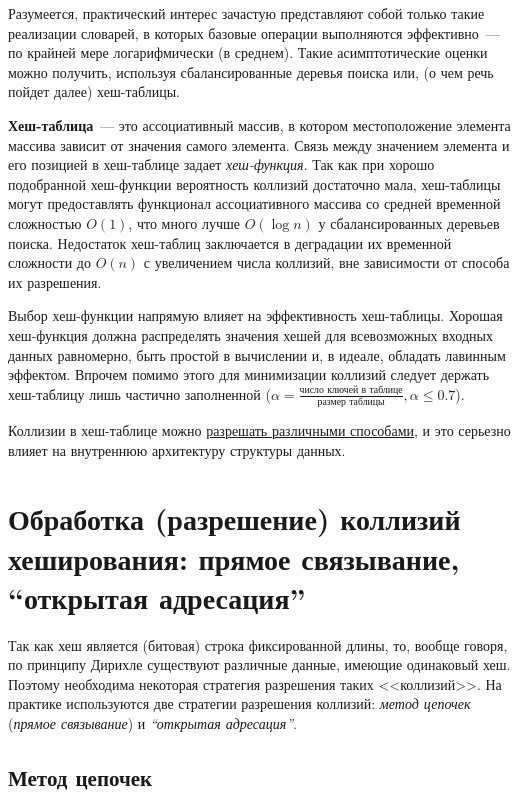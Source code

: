 Разумеется, практический интерес зачастую представляют собой только такие реализации словарей, в которых базовые операции выполняются эффективно~---
по крайней мере логарифмически (в среднем). Такие асимптотические оценки можно получить, используя сбалансированные деревья поиска или,
(о чем речь пойдет далее) хеш-таблицы.

\textbf{Хеш-таблица}~--- это ассоциативный массив, в котором местоположение элемента массива зависит от значения самого элемента.
Связь между значением элемента и его позицией в хеш-таблице задает \textit{хеш-функция}.
Так как при хорошо подобранной хеш-функции вероятность коллизий достаточно мала, хеш-таблицы могут предоставлять функционал ассоциативного массива
со средней временной сложностью $O(1)$, что много лучше $O(\log{n})$ у сбалансированных деревьев поиска. Недостаток хеш-таблиц заключается в
деградации их временной сложности до $O(n)$ с увеличением числа коллизий, вне зависимости от способа их разрешения.

Выбор хеш-функции напрямую влияет на эффективность хеш-таблицы. Хорошая хеш-функция должна распределять значения хешей для всевозможных входных данных равномерно,
быть простой в вычислении и, в идеале, обладать лавинным эффектом. Впрочем помимо этого для минимизации коллизий следует держать хеш-таблицу лишь
частично заполненной ($\alpha = \frac{\text{число ключей в таблице}}{\text{размер таблицы}}, \alpha \leq 0.7$).

Коллизии в хеш-таблице можно \hyperref[sec:hashtable-collisions]{разрешать различными способами}, и это серьезно влияет на внутреннюю
архитектуру структуры данных.

\section{Обработка (разрешение) коллизий хеширования: прямое связывание, ``открытая адресация''}
\label{sec:hashtable-collisions}
Так как хеш является (битовая) строка фиксированной длины, то, вообще говоря, по принципу Дирихле существуют различные данные,
имеющие одинаковый хеш. Поэтому необходима некоторая стратегия разрешения таких <<коллизий>>. На практике используются две стратегии разрешения
коллизий: \textit{метод цепочек} (\textit{прямое связывание}) и \textit{``открытая адресация''}.

\subsection{Метод цепочек} \label{sec:chain_method}

